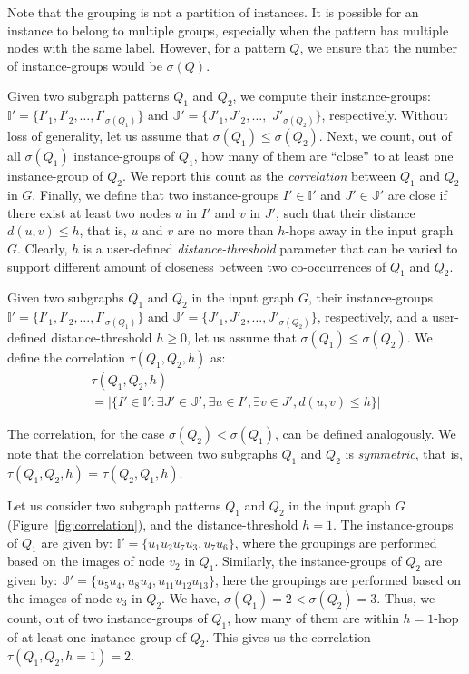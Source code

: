 Note that the grouping is not a partition of instances. It is possible for an instance 
to belong to multiple groups, especially when the pattern has multiple nodes with the same label. 
However, for a pattern $Q$, we ensure that the number of instance-groups would be $\sigma(Q)$.

Given two subgraph patterns $Q_1$ and $Q_2$, we compute their instance-groups:
$\mathbb{I'}=\{I'_1,I'_2,\ldots,I'_{\sigma(Q_1)}\}$ and $\mathbb{J'}=\{J'_1,J'_2,\ldots,$ $J'_{\sigma(Q_2)}\}$,
respectively. Without loss of generality, let us assume that $\sigma(Q_1) \le \sigma(Q_2)$. 
Next, we count, out of all $\sigma(Q_1)$  instance-groups of $Q_1$, how many of them are ``close'' to at least
one instance-group of $Q_2$. We report this count as the {\em correlation} between $Q_1$ and $Q_2$ in $G$.
Finally, we define that two instance-groups $I' \in \mathbb{I'}$ and $J' \in \mathbb{J'}$
are close if there exist at least two nodes $u$ in $I'$ and $v$ in $J'$, such that their distance $d(u,v)\le h$,
that is, $u$ and $v$ are no more than $h$-hops away in the input graph $G$.
Clearly, $h$ is a user-defined {\em distance-threshold} parameter that can be varied to support different
amount of closeness between two co-occurrences of $Q_1$ and $Q_2$.

\begin{defn}[Correlation]
\label{def:correlation}
Given two subgraphs $Q_1$ and $Q_2$ in the input graph $G$, their instance-groups
$\mathbb{I'}=\{I'_1,I'_2,\ldots,I'_{\sigma(Q_1)}\}$ and $\mathbb{J'}=\{J'_1,J'_2,\ldots,J'_{\sigma(Q_2)}\}$,
respectively, and a user-defined distance-threshold $h\ge0$,
let us assume that $\sigma(Q_1) \le \sigma(Q_2)$. We define the correlation
$\tau(Q_1,Q_2,h)$ as:
%
\begin{align}
&\tau(Q_1,Q_2,h) \nonumber & \\
&= |\{I' \in \mathbb{I'}:\exists J' \in \mathbb{J'}, \exists u \in I', \exists v \in J', d(u,v)\le h\}|&
\end{align}
\end{defn}

The correlation, for the case $\sigma(Q_2) < \sigma(Q_1)$, can be defined analogously.
We note that the correlation between two subgraphs $Q_1$ and $Q_2$ is {\em symmetric}, that is,
$\tau(Q_1,Q_2,h)$ = $\tau(Q_2,Q_1,h)$.

\begin{exple}
Let us consider two subgraph patterns $Q_1$ and $Q_2$ in the input graph $G$ (Figure~\ref{fig:correlation}),
and the distance-threshold $h=1$. The instance-groups of $Q_1$ are given by: $\mathbb{I'}=\{u_1u_2u_7u_3,u_7u_6\}$,
where the groupings are performed based on the images of node $v_2$ in $Q_1$. Similarly,
the instance-groups of $Q_2$ are given by: $\mathbb{J'}=\{u_5u_4, u_8u_4,u_{11}u_{12}u_{13}\}$,
here the groupings are performed based on the images of node $v_3$ in $Q_2$. We have,
$\sigma(Q_1) =2 < \sigma(Q_2) =3$. Thus, we count, out
of two instance-groups of $Q_1$, how many of them are within $h=1$-hop of at least
one instance-group of $Q_2$. This gives us the correlation $\tau(Q_1,Q_2,h=1)=2$.
\end{exple}

